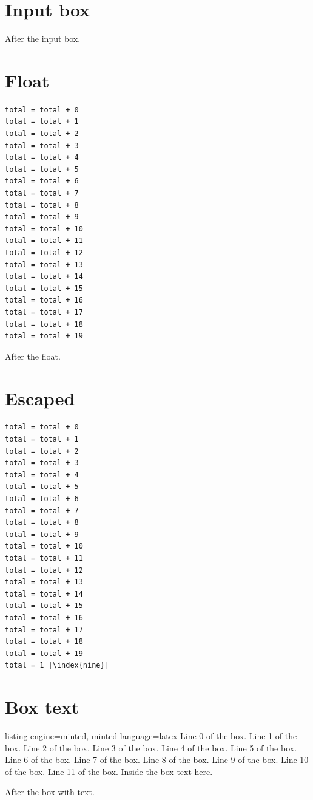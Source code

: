\documentclass{article}
\begin{document}
\section{Input box}
After the input box.
\section{Float}
\begin{listing}[h]
\begin{verbatim}
total = total + 0
total = total + 1
total = total + 2
total = total + 3
total = total + 4
total = total + 5
total = total + 6
total = total + 7
total = total + 8
total = total + 9
total = total + 10
total = total + 11
total = total + 12
total = total + 13
total = total + 14
total = total + 15
total = total + 16
total = total + 17
total = total + 18
total = total + 19
\end{verbatim}
\caption{A listing in a float}
\end{listing}
After the float.
\section{Escaped}
\begin{verbatim}
total = total + 0
total = total + 1
total = total + 2
total = total + 3
total = total + 4
total = total + 5
total = total + 6
total = total + 7
total = total + 8
total = total + 9
total = total + 10
total = total + 11
total = total + 12
total = total + 13
total = total + 14
total = total + 15
total = total + 16
total = total + 17
total = total + 18
total = total + 19
total = 1 |\index{nine}|
\end{verbatim}
\section{Box text}
\begin{tcblisting}{listing engine=minted, minted language=latex}
Line 0 of the box.
Line 1 of the box.
Line 2 of the box.
Line 3 of the box.
Line 4 of the box.
Line 5 of the box.
Line 6 of the box.
Line 7 of the box.
Line 8 of the box.
Line 9 of the box.
Line 10 of the box.
Line 11 of the box.
Inside the box text here.
\end{tcblisting}
After the box with text.
\end{document}
